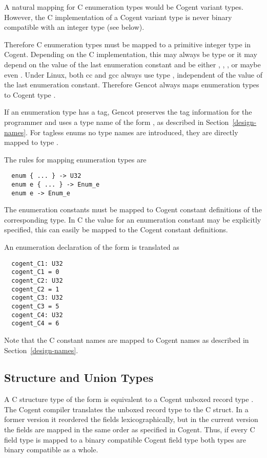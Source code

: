 A natural mapping for C enumeration types would be Cogent variant types. However, the C implementation
of a Cogent variant type is never binary compatible with an integer type (see below). 

Therefore C enumeration types must be mapped to a primitive integer type in Cogent. Depending on the C
implementation, this may always be type  or it may depend on the value of the last enumeration
constant and be either , , , or maybe even . Under Linux, both cc
and gcc always use type , independent of the value of the last enumeration constant. 
Therefore Gencot always maps enumeration types to Cogent type .

If an enumeration type has a tag, Gencot preserves the tag information for the programmer and uses
a type name of the form , as described in Section~\ref{design-names}. For tagless enums
no type names are introduced, they are directly mapped to type .

The rules for mapping enumeration types are
\begin{verbatim}
  enum { ... } -> U32
  enum e { ... } -> Enum_e
  enum e -> Enum_e
\end{verbatim}

The enumeration constants must be mapped to Cogent constant definitions of the corresponding type. In 
C the value for an enumeration constant may be explicitly specified, this can easily be mapped to
the Cogent constant definitions.

An enumeration declaration of the form  is translated as
\begin{verbatim}
  cogent_C1: U32
  cogent_C1 = 0
  cogent_C2: U32
  cogent_C2 = 1
  cogent_C3: U32
  cogent_C3 = 5
  cogent_C4: U32
  cogent_C4 = 6
\end{verbatim}
Note that the C constant names are mapped to Cogent names as described in Section~\ref{design-names}.

\subsection{Structure and Union Types}
\label{design-types-struct}

A C structure type of the form  is equivalent to a Cogent unboxed record type .
The Cogent compiler translates the unboxed record type to the C struct. In a former version it reordered the fields 
lexicographically, but in the current version the fields are mapped in the same order as specified in Cogent.
Thus, if every C field type is mapped to a binary compatible Cogent field type both types are binary compatible as a whole.

